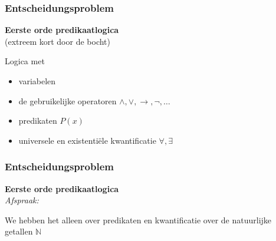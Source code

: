 \documentclass{beamer}
\begin{document}
\begin{frame}
    \frametitle{Entscheidungsproblem}
    \textbf{Eerste orde predikaatlogica} \\
    (extreem kort door de bocht) 
    \bigskip
    
    Logica met
    \begin{itemize}
        \item<2-> variabelen
        \item<3-> de gebruikelijke operatoren $\wedge, \vee, \rightarrow, \neg, \ldots$
        \item<4-> predikaten $P(x)$
        \item<5-> universele en existentiële kwantificatie $\forall, \exists$
    \end{itemize}

\end{frame}

\begin{frame}
    \frametitle{Entscheidungsproblem}
    \textbf{Eerste orde predikaatlogica} \\

    \emph{Afspraak:}

    We hebben het alleen over predikaten en kwantificatie over de natuurlijke getallen $\mathbb{N}$

    \vspace{1cm}

    

    \vspace{1cm}
\end{frame}
\end{document}
